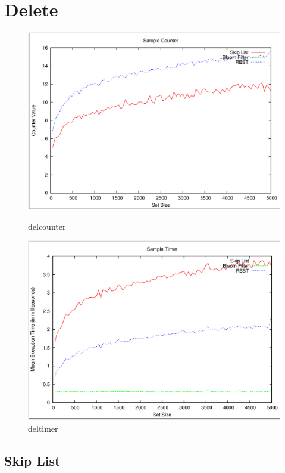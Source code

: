 \documentclass[11pt]{article}
\begin{document}
\section*{Delete}
\begin{figure}[H]
\begin{minipage}{.5\linewidth}
\centering
\includegraphics[width=1\linewidth]{delcounter.png}
\caption{delcounter}
\end{minipage}
\hspace{0.5cm}
\begin{minipage}{.5\linewidth}
\centering
\includegraphics[width=1\linewidth]{deltimer.png}
\caption{deltimer}
\end{minipage}
\end{figure}
\subsection*{Skip List}
\end{document}
